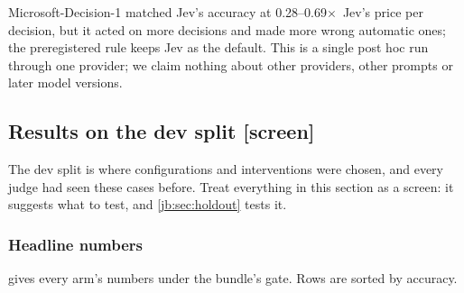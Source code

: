 \documentclass[11pt,letterpaper]{article}
\newcommand{\X}{\ensuremath{\times}}
\newcommand{\screen}{\mbox{\textsf{\small\color{okgray}[screen]}}}
\newcommand{\MsPriceXHi}{0.69}
\newcommand{\MsPriceXLo}{0.28}
\begin{document}
\begin{keyidea}
Microsoft-Decision-1 matched Jev's accuracy at \MsPriceXLo--\MsPriceXHi\X\ Jev's price per decision, but it acted on more decisions
and made more wrong automatic ones; the preregistered rule keeps Jev as the default. This is a single post hoc run
through one provider; we claim nothing about other providers, other prompts or later model versions.
\end{keyidea}
\subsection{Results on the dev split \texorpdfstring{\screen}{[screen]}}\label{jb:sec:dev}

The dev split is where configurations and interventions were chosen, and every judge had seen these
cases before. Treat everything in this section as a screen: it suggests what to test, and
\cref{jb:sec:holdout} tests it.

\subsubsection{Headline numbers}

 gives every arm's numbers under the bundle's gate. Rows are sorted by accuracy.
\end{document}
